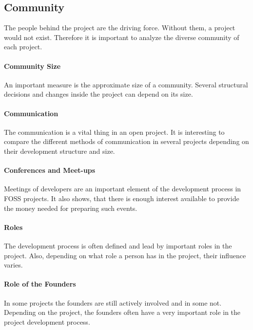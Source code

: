 \subsection{Community}

The people behind the project are the driving force. Without them, a project
would not exist. Therefore it is important to analyze the diverse community of
each project.

\paragraph{Community Size}

An important measure is the approximate size of a community. Several structural
decisions and changes inside the project can depend on its size.

\paragraph{Communication}

The communication is a vital thing in an open project. It is interesting to
compare the different methods of communication in several projects depending on
their development structure and size.

\paragraph{Conferences and Meet-ups}

Meetings of developers are an important element of the development process in
\ac{FOSS} projects. It also shows, that there is enough interest available to
provide the money needed for preparing such events.

\paragraph{Roles}

The development process is often defined and lead by important roles in the
project. Also, depending on what role a person has in the project, their
influence varies.

\paragraph{Role of the Founders}

In some projects the founders are still actively involved and in some not.
Depending on the project, the founders often have a very important role in the
project development process.

